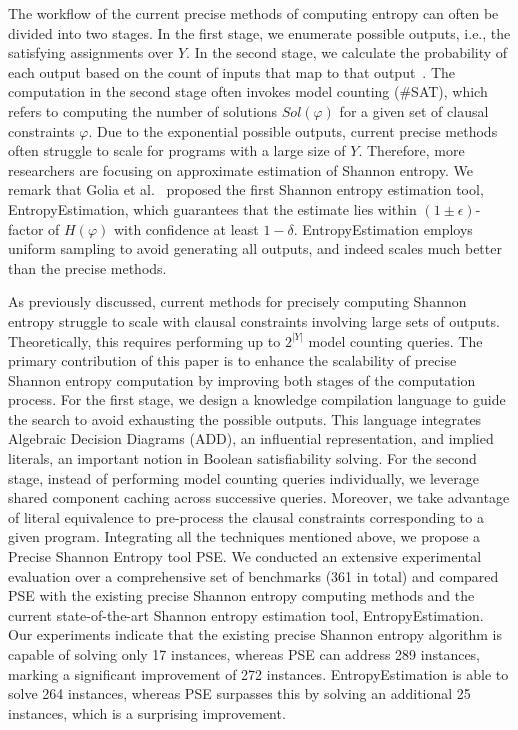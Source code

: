 The workflow of the current precise methods of computing entropy can often be divided into two stages. 
In the first stage, we enumerate possible outputs, i.e., the satisfying assignments over $Y$. 
In the second stage, we calculate the probability of each output based on the count of inputs that map to that output~\cite{golia2022scalable}.
The computation in the second stage often invokes model counting (\#SAT), which refers to computing the number of solutions $\mathit{Sol}(\varphi)$ for a given set of clausal constraints $\varphi$. 
Due to the exponential possible outputs, current precise methods often struggle to scale for programs with a large size of $Y$.
Therefore, more researchers are focusing on approximate estimation of Shannon entropy.
We remark that Golia et al.~\cite{golia2022scalable} proposed the first Shannon entropy estimation tool, EntropyEstimation, which guarantees that the estimate lies within $(1 \pm \epsilon)$-factor of $H(\varphi)$ with confidence at least $1-\delta$.
EntropyEstimation employs uniform sampling to avoid generating all outputs, and indeed scales much better than the precise methods. 

As previously discussed, current methods for precisely computing Shannon entropy struggle to scale with clausal constraints involving large sets of outputs.
Theoretically, this requires performing up to $2^{|Y|}$ model counting queries.
The primary contribution of this paper is to enhance the scalability of precise Shannon entropy computation by improving both stages of the computation process.
For the first stage, we design a knowledge compilation language to guide the search to avoid exhausting the possible outputs. 
This language integrates Algebraic Decision Diagrams (ADD), an influential representation, and implied literals, an important notion in Boolean satisfiability solving.
For the second stage, instead of performing model counting queries individually, we leverage shared component caching across successive queries.
Moreover, we take advantage of literal equivalence to pre-process the clausal constraints corresponding to a given program.
Integrating all the techniques mentioned above, we propose a Precise Shannon Entropy tool PSE.
We conducted an extensive experimental evaluation over a comprehensive set of benchmarks (361 in total) and compared PSE with the existing precise Shannon entropy computing methods and the current state-of-the-art Shannon entropy estimation tool, EntropyEstimation. %
Our experiments indicate that the existing precise Shannon entropy algorithm is capable of solving only 17 instances, whereas PSE can address 289 instances, marking a significant improvement of 272 instances.
EntropyEstimation is able to solve 264 instances, whereas PSE surpasses this by solving an additional 25 instances, which is a surprising improvement.

